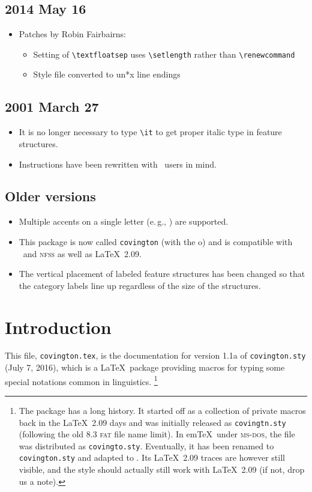 \documentclass[english]{article}
\newcommand*\jfmacro[1]{\texttt{#1}}
\newcommand*\jfcsmacro[1]{\jfmacro{\textbackslash{#1}}}
\def\pversion{Version 1.1a}
\def\pdate{July 7, 2016}
\begin{document}
\subsection*{2014 May 16}

\begin{itemize}
	\item Patches by Robin Fairbairns:
	\begin{itemize}
	    \item Setting of \jfcsmacro{textfloatsep} uses \jfcsmacro{setlength} rather than \jfcsmacro{renewcommand}
	    \item Style file converted to un*x line endings
    \end{itemize}
\end{itemize}

\subsection*{2001 March 27}

\begin{itemize}
\item It is no longer necessary to type \jfcsmacro{it} to get proper italic type in feature structures.
\item Instructions have been rewritten with \LaTeXe\ users in mind.
\end{itemize}

\subsection*{Older versions}

\begin{itemize}
\item Multiple accents on a single letter (e.\,g., \emph{}) are supported.
\item This package is now called \texttt{covington} (with the o)
and is compatible with \LaTeXe\ and \textsc{nfss} as well as \LaTeX\ 2.09.
\item The vertical placement of labeled feature structures has 
been changed
so that the category labels line up regardless of the size of
the structures.
\end{itemize}


\section*{Introduction}

This file, \texttt{covington.tex}, is the documentation for \MakeLowercase{\pversion}
of \texttt{covington.sty} (\pdate), which is a \LaTeX\ package providing macros
for typing some special notations common in linguistics.%
\footnote{The package has a long history. It started off as a collection of private macros back in the \LaTeX\ 2.09 days and was initially released as \texttt{covingtn.sty} (following the old 8.3 \textsc{fat} file name limit). In em\TeX\ under \textsc{ms-dos}, the file was distributed as \texttt{covingto.sty}. Eventually, it has been renamed to \texttt{covington.sty} and adapted to \LaTeXe. Its \LaTeX\ 2.09 traces are however still visible, and the style should actually still work with \LaTeX\ 2.09 (if not, drop us a note).}
\end{document}
